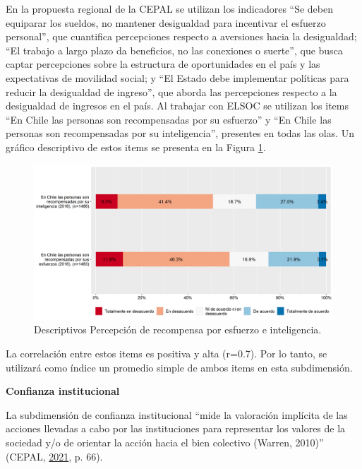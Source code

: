 \documentclass[
  12pt,
]{book}
\begin{document}
En la propuesta regional de la CEPAL se utilizan los indicadores ``Se deben equiparar los sueldos, no mantener desigualdad para incentivar el esfuerzo personal'', que cuantifica percepciones respecto a aversiones hacia la desigualdad; ``El trabajo a largo plazo da beneficios, no las conexiones o suerte'', que busca captar percepciones sobre la estructura de oportunidades en el país y las expectativas de movilidad social; y ``El Estado debe implementar políticas para reducir la desigualdad de ingreso'', que aborda las percepciones respecto a la desigualdad de ingresos en el país. Al trabajar con ELSOC se utilizan los items ``En Chile las personas son recompensadas por su esfuerzo'' y ``En Chile las personas son recompensadas por su inteligencia'', presentes en todas las olas. Un gráfico descriptivo de estos items se presenta en la Figura \ref{fig:justicia}.

\begin{figure}[H]

{\centering \includegraphics[width=1\linewidth,height=1\textheight]{output/graphs/justicia} 

}

\caption{Descriptivos Percepción de recompensa por esfuerzo e inteligencia.}\label{fig:justicia}
\end{figure}

La correlación entre estos items es positiva y alta (r=0.7). Por lo tanto, se utilizará como índice un promedio simple de ambos items en esta subdimensión.

\textbf{Confianza institucional}

La subdimensión de confianza institucional ``mide la valoración implícita de las acciones llevadas a cabo por las instituciones para representar los valores de la sociedad y/o de orientar la acción hacia el bien colectivo (Warren, 2010)'' (CEPAL, \protect\hyperlink{ref-cepal_cohesion_2021}{2021}, p. 66).
\end{document}
